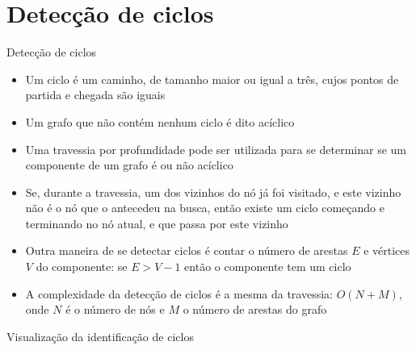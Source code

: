 \section{Detecção de ciclos}

\begin{frame}[fragile]{Detecção de ciclos}

    \begin{itemize}
        \item Um ciclo é um caminho, de tamanho maior ou igual a três, cujos pontos de partida e 
            chegada são iguais

        \item Um grafo que não contém nenhum ciclo é dito acíclico

        \item Uma travessia por profundidade pode ser utilizada para se determinar se um
            componente de um grafo é ou não acíclico

        \item Se, durante a travessia, um dos vizinhos do nó já foi visitado, e este vizinho 
            não é o nó que o antecedeu na busca, então existe um ciclo começando e terminando
            no nó atual, e que passa por este vizinho

        \item Outra maneira de se detectar ciclos é contar o número de arestas $E$ e vértices $V$ do
            componente: se $E > V - 1$ então o componente tem um ciclo

        \item A complexidade da detecção de ciclos é a mesma da travessia: $O(N + M)$, onde $N$
            é o número de nós e $M$ o número de arestas do grafo
    \end{itemize}

\end{frame}

\begin{frame}[fragile]{Visualização da identificação de ciclos}


\end{frame}

